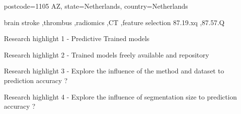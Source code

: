\documentclass[preprint,12pt]{elsarticle}
\begin{document}
\begin{frontmatter}
{            postcode={1105 AZ}, 
            state={Netherlands},
            country={Netherlands}}

\begin{abstract}
Background and Objectives
Methods
Results
Conclusions

\end{abstract}

\begin{graphicalabstract}
\end{graphicalabstract}

\begin{keyword}
brain stroke \sep thrombus \sep radiomics \sep CT \sep feature selection
87.19.xq \sep 87.57.Q

\end{keyword}

\begin{highlights} %
\item Research highlight 1 - Predictive Trained models
\item Research highlight 2 - Trained models freely available and repository
\item Research highlight 3 - Explore the influence of the method and dataset to prediction accuracy ?
\item Research highlight 4 - Explore the influence of segmentation size to prediction accuracy ?
\end{highlights}


\end{frontmatter}
\end{document}
